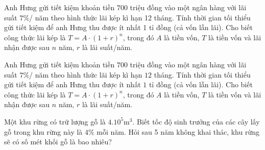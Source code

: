 \begin{bt}%
	Anh Hưng gửi tiết kiệm khoản tiền $700$ triệu  đồng vào một ngân hàng với lãi suất $7\%$/ năm theo hình thức lãi kép kì hạn 12 tháng. Tính thời gian tối thiểu gửi tiết kiệm để anh Hưng thu được ít nhất 1 tỉ đồng (cả vốn lẫn lãi). Cho biết công thức lãi kép là $ T=A\cdot(1+r)^n $, trong đó $ A $ là tiền vốn, $ T $ là tiền vốn và lãi nhận được sau $ n $ năm, $ r $ là lãi suất/năm.
\end{bt}

\begin{ex}%
	Anh Hưng gửi tiết kiệm khoản tiền $700$ triệu đồng vào một ngân hàng với lãi suất $7 \%$/ năm theo hình thức lãi kép kì hạn $12$ tháng. Tính thời gian tối thiểu gửi tiết kiệm để anh Hưng thu được ít nhất $1$ tỉ đồng (cả vốn  lẫn lãi). Cho biết công thức lãi kép là $T=A \cdot(1+r)^n$, trong đó $A$ là tiền vốn, $T$ là tiền vốn và lãi nhận được sau $n$ năm, $r$ là lãi suất/năm.
\end{ex}

\begin{ex}%
	Một khu rừng có trữ lượng gỗ là $4.10^5$m$^3$. Biết tốc độ sinh trưởng của các cây lấy gỗ trong khu rừng này là $4\%$ mỗi năm. Hỏi sau 5 năm không khai thác,  khu rừng sẽ có số mét khối gỗ là bao nhiêu?
\end{ex}

